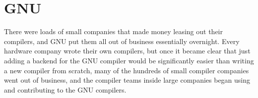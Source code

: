 \section{GNU}

There were loads of small companies that made money leasing out their compilers,
and GNU put them all out of business essentially overnight.
Every hardware company wrote their own compilers, but once it became clear
that just adding a backend for the GNU compiler would be significantly easier
than writing a new compiler from scratch, many of the hundreds of small compiler
companies went out of business, and the compiler teams inside large companies
began using and contributing to the GNU compilers.
